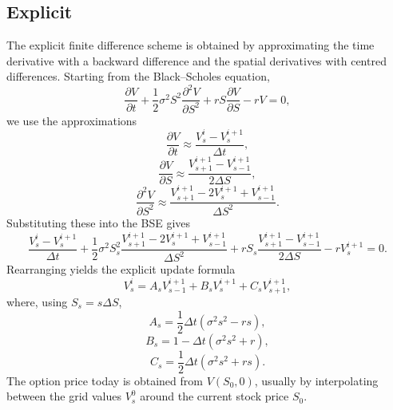 \documentclass[11pt]{report}
\begin{document}
\subsection{Explicit}\label{sec:explicit}

The explicit finite difference scheme is obtained by approximating 
the time derivative with a backward difference and the spatial 
derivatives with centred differences. Starting from the Black--Scholes equation,
\begin{equation}
    \frac{\partial V}{\partial t}
    + \frac{1}{2}\sigma^{2} S^{2} \frac{\partial^{2} V}{\partial S^{2}}
    + r S \frac{\partial V}{\partial S}
    - r V = 0,
\end{equation}
we use the approximations
\begin{equation}
\frac{\partial V}{\partial t} \approx \frac{V_s^i - V_s^{i+1}}{\Delta t},
\end{equation}
\begin{equation}
\frac{\partial V}{\partial S} \approx \frac{V_{s+1}^{i+1} - V_{s-1}^{i+1}}{2\Delta S},
\end{equation}
\begin{equation}
\frac{\partial^{2} V}{\partial S^{2}} \approx \frac{V_{s+1}^{i+1} - 2V_s^{i+1} + V_{s-1}^{i+1}}{\Delta S^2}.
\end{equation}
Substituting these into the BSE gives
\begin{equation}
  \frac{V_s^i - V_s^{i+1}}{\Delta t}
  + \frac{1}{2} \sigma^2 S_s^2 \frac{V_{s+1}^{i+1} - 2V_s^{i+1} + V_{s-1}^{i+1}}{\Delta S^2}
  + rS_s \frac{V_{s+1}^{i+1} - V_{s-1}^{i+1}}{2\Delta S}
  - rV_s^{i+1} = 0.
\end{equation}
Rearranging yields the explicit update formula
\begin{equation}
  V_s^i = A_s V_{s-1}^{i+1} + B_s V_s^{i+1} + C_s V_{s+1}^{i+1},
  \label{eq:exp}
\end{equation}
where, using $S_s = s\Delta S$, \label{sec:coeffs}
\begin{equation}
A_s = \frac{1}{2} \Delta t \left(\sigma^2 s^2 - r s\right),
\end{equation}
\begin{equation}
B_s = 1 - \Delta t \left(\sigma^2 s^2 + r\right),
\end{equation}
\begin{equation}
C_s = \frac{1}{2} \Delta t \left(\sigma^2 s^2 + r s\right).
\end{equation}
The option price today is obtained from $V(S_0,0)$, usually by 
interpolating between the grid values $V_s^0$ around the current 
stock price $S_0$.
\end{document}
